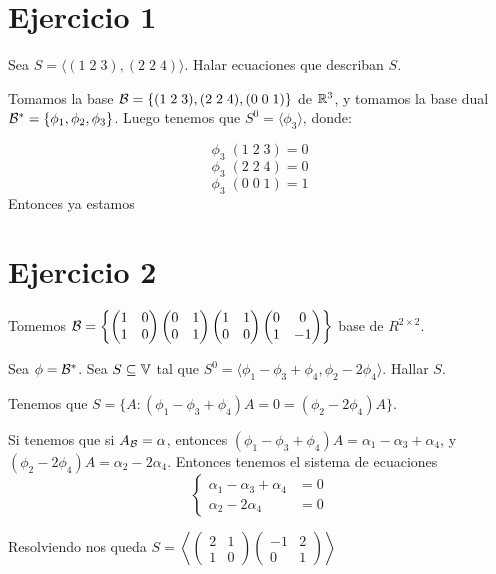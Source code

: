 \documentclass{article}
\begin{document}
\section*{Ejercicio 1}
Sea $S = \langle (1 \; 2 \; 3), (2 \; 2 \;  4) \rangle$. Halar ecuaciones que
describan $S$.

Tomamos la base $\mathcal{B} = \{(1 \; 2 \; 3) , (2 \; 2\; 4) , (0 \; 0 \; 1)\}$ de
$\mathbb{R}^3$, y tomamos la base dual $\mathcal{B}^* = \{\phi_1, \phi_2, \phi_3\}$. Luego
tenemos que $S^0 = \langle \phi_3 \rangle$, donde:

\[\phi_3 \; (1 \; 2 \; 3) = 0\]
\[\phi_3 \; (2 \; 2 \; 4) = 0\]
\[\phi_3 \; (0 \; 0 \; 1) = 1\]
Entonces ya estamos

\section*{Ejercicio 2}
Tomemos $
\mathcal{B} = \left\{
	\begin{pmatrix}
		1 & 0 \\
		1 & 0
	\end{pmatrix}
	\begin{pmatrix}
		0 & 1 \\
		0 & 1
	\end{pmatrix}
	\begin{pmatrix}
		1 & 1 \\
		0 & 0
	\end{pmatrix}
	\begin{pmatrix}
		0 & 0 \\
		1 &-1 
	\end{pmatrix}
\right\}
$ base de $R^{2 \times 2}$.

Sea $\phi = \mathcal{B}^*$. Sea $S \subseteq \mathbb{V}$ tal que $S^0 = \langle \phi_1 - \phi_3 +
\phi_4, \phi_2 - 2\phi_4 \rangle$. Hallar $S$.

Tenemos que $S = \{A : (\phi_1-\phi_3+\phi_4) A = 0 = (\phi_2 - 2\phi_4) A\}$.

Si tenemos que si $A_{\mathcal{B}} = \alpha$, entonces $(\phi_1-\phi_3+\phi_4) A = 
\alpha_1 - \alpha_3 + \alpha_4
$, y $(\phi_2 - 2\phi_4) A = \alpha_2 - 2\alpha_4$. Entonces tenemos el sistema
de ecuaciones
\[
	\begin{cases}
		\alpha_1 - \alpha_3 + \alpha_4 &= 0 \\
		\alpha_2 - 2\alpha_4 &= 0
	\end{cases}
\]

Resolviendo nos queda $S = \left\langle
\begin{pmatrix}
	2 & 1 \\
	1 & 0
\end{pmatrix}
\begin{pmatrix}
	-1 & 2 \\
	0 & 1
\end{pmatrix}
\right\rangle$
\end{document}
